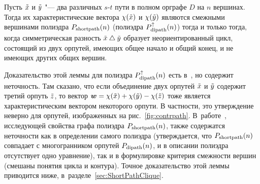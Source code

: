 \begin{lemma}
\label{lem:path}
Пусть $\tilde x$ и $\tilde y$ "--- два различных $s$-$t$ пути в полном орграфе $D$ на $n$ вершинах.
Тогда их характеристические вектора $\chi(\tilde x)$ и $\chi(\tilde y)$ являются смежными вершинами полиэдра $P_{\textup{shortpath}}(n)$ (полиэдра $P_{\textup{dipath}}^{\uparrow}(n)$) тогда и только тогда, когда симметрическая разность $\tilde x \bigtriangleup \tilde y$ образует неориентированный цикл, состоящий из двух орпутей, имеющих общее начало и общий конец, и не имеющих других общих вершин.
\end{lemma}

\begin{remark}
Доказательство этой леммы для полиэдра $P_{\textup{dipath}}^{\uparrow}(n)$ есть в~\cite[theorem~13.4, p.~202]{SchrijverCO:2003}, но содержит неточность. Там сказано, что если объединение двух орпутей $\tilde x$ и $\tilde y$ содержит третий орпуть $\tilde z$, то вектор $\bm{w} = \chi(\tilde x) + \chi(\tilde y) - \chi(\tilde z)$ тоже является характеристическим вектором некоторого орпути.
В частности, это утверждение неверно для орпутей, изображенных на рис.~\ref{fig:contrpath}. 
В~работе~\cite{Rispoli:1992}, исследующей свойства графа полиэдра $P_{\textup{shortpath}}(n)$, также содержатся неточности как в определении самого полиэдра (утверждается, что $P_{\textup{shortpath}}(n)$ совпадает с многогранником орпутей $P_{\textup{dipath}}(n)$, и в описании полиэдра отсутствует одно уравнение), так и в формулировке критерия смежности вершин (смешаны понятия цикла и контура).
Точное доказательство этой леммы приводится ниже, в~разделе~\ref{sec:ShortPathClique}.
\end{remark}
